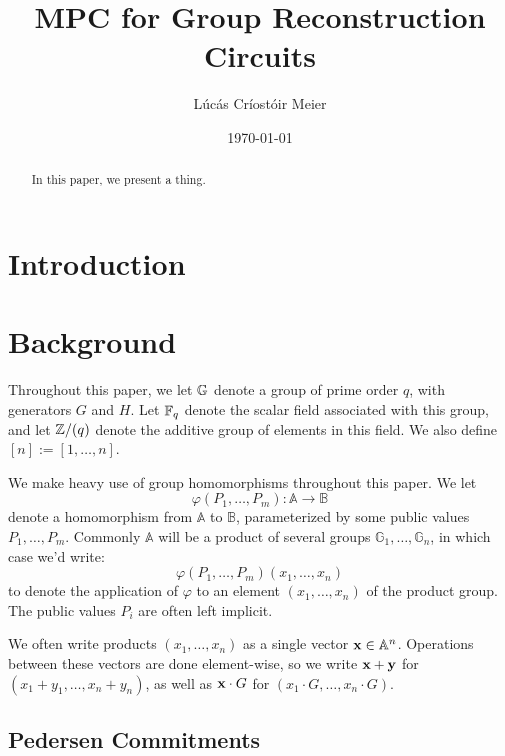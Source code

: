 

\date{\today}
\title{MPC for Group Reconstruction Circuits}
\author{Lúcás Críostóir Meier}



\maketitle

\begin{abstract}
    In this paper, we present a thing.
\end{abstract}

\section{Introduction}


\section{Background}

Throughout this paper, we let $\mathbb{G}$ denote a group of prime order $q$,
with generators $G$ and $H$. Let $\mathbb{F}_q$ denote the scalar field associated
with this group, and let $\mathbb{Z}/(q)$ denote the additive group of elements
in this field. We also define $[n] := [1, \ldots, n]$.

We make heavy use of group homomorphisms throughout this paper.
We let
$$
\varphi(P_1, \ldots, P_m) : \mathbb{A} \to \mathbb{B}
$$
denote a homomorphism from $\mathbb{A}$ to $\mathbb{B}$, parameterized
by some public values $P_1, \ldots, P_m$. Commonly $\mathbb{A}$
will be a product of several groups $\mathbb{G}_1, \ldots, \mathbb{G}_n$,
in which case we'd write:
$$
\varphi(P_1, \ldots, P_m)(x_1, \ldots, x_n)
$$
to denote the application of $\varphi$ to an element $(x_1, \ldots, x_n)$
of the product group. The public values $P_i$ are often left implicit.

We often write products $(x_1, \ldots, x_n)$ as a single vector
$\textbf{x} \in \mathbb{A}^n$. Operations between these vectors
are done element-wise, so we write $\textbf{x} + \textbf{y}$ for ${(x_1 + y_1, \ldots, x_n + y_n)}$,
as well as $\textbf{x} \cdot G$ for $(x_1 \cdot G, \ldots, x_n \cdot G)$.

\subsection{Pedersen Commitments}

